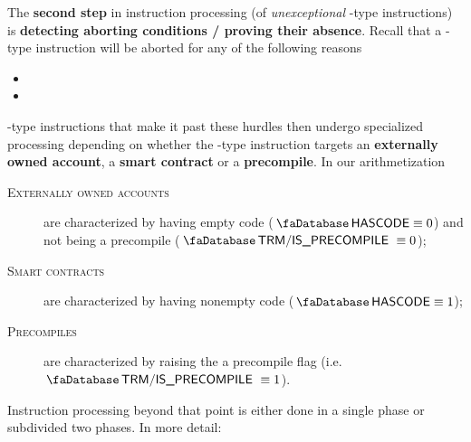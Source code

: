 The \textbf{second step} in instruction processing (of \emph{unexceptional} -type instructions) is \textbf{detecting aborting conditions / proving their absence}.
Recall that a -type instruction will be aborted for any of the following reasons
\begin{itemize}
	\item \balAbortSH{}
	\item \csdAbortSH{}
\end{itemize}
-type instructions that make it past these hurdles then undergo specialized processing depending on whether the -type instruction targets
an \textbf{externally owned account},
a  \textbf{smart contract} or
a  \textbf{precompile}.
In our arithmetization
\begin{description}
	\item[\textsc{Externally owned accounts}]
		are characterized by having empty code ($\accHasCode \equiv 0$) and not being a precompile ($\accTrmIsPrecompile \equiv 0$);
	\item[\textsc{Smart contracts}]
		are characterized by having nonempty code ($\accHasCode \equiv 1$);
	\item[\textsc{Precompiles}]
		are characterized by raising the a precompile flag (i.e. $\accTrmIsPrecompile \equiv 1$).
\end{description}
Instruction processing beyond that point is either done in a single phase or subdivided two phases.
In more detail:
